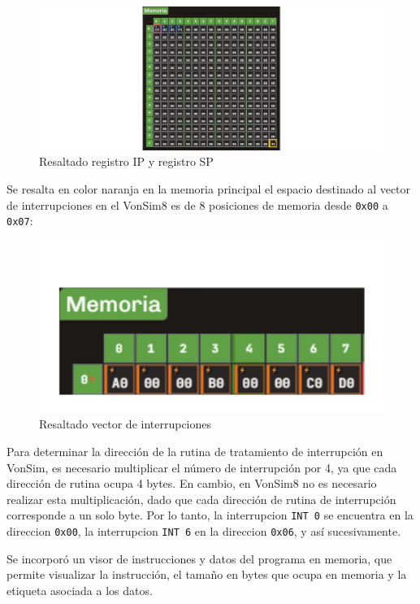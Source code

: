 \documentclass[12pt,oneside]{templates/unerthesis}
\begin{document}
\begin{figure}

{\centering \includegraphics[width=1\linewidth]{images/resaltadoipsp} 

}

\caption{Resaltado registro IP y registro SP}\label{fig:resaltadoip}
\end{figure}

Se resalta en color naranja en la memoria principal el espacio destinado al vector de interrupciones en el VonSim8 es de 8 posiciones de memoria desde \texttt{0x00} a \texttt{0x07}:

\begin{figure}

{\centering \includegraphics[width=0.5\linewidth]{images/resaltadoint} 

}

\caption{Resaltado vector de interrupciones}\label{fig:resaltadointsp}
\end{figure}

Para determinar la dirección de la rutina de tratamiento de interrupción en VonSim, es necesario multiplicar el número de interrupción por 4, ya que cada dirección de rutina ocupa 4 bytes. En cambio, en VonSim8 no es necesario realizar esta multiplicación, dado que cada dirección de rutina de interrupción corresponde a un solo byte. Por lo tanto, la interrupcion \texttt{INT\ 0} se encuentra en la direccion \texttt{0x00}, la interrupcion \texttt{INT\ 6} en la direccion \texttt{0x06}, y así sucesivamente.

Se incorporó un visor de instrucciones y datos del programa en memoria, que permite visualizar la instrucción, el tamaño en bytes que ocupa en memoria y la etiqueta asociada a los datos.
\end{document}
